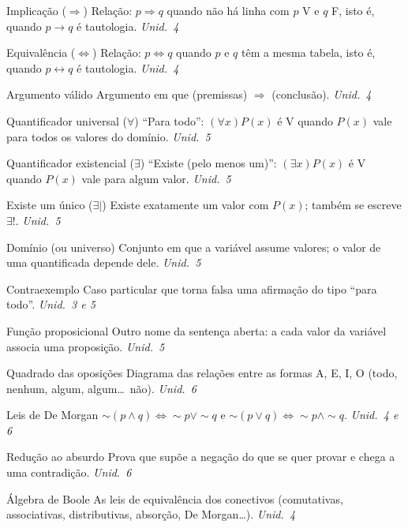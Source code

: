\begin{glossario}
\item[Implicação ($\Rightarrow$)] Relação: $p\Rightarrow q$ quando não há linha com $p$ V e $q$ F, isto é, quando $p\rightarrow q$ é tautologia. \hfill\emph{Unid.~4}
\item[Equivalência ($\Leftrightarrow$)] Relação: $p\Leftrightarrow q$ quando $p$ e $q$ têm a mesma tabela, isto é, quando $p\leftrightarrow q$ é tautologia. \hfill\emph{Unid.~4}
\item[Argumento válido] Argumento em que (premissas) $\Rightarrow$ (conclusão). \hfill\emph{Unid.~4}
\item[Quantificador universal ($\forall$)] \enquote{Para todo}: $(\forall x)P(x)$ é V quando $P(x)$ vale para todos os valores do domínio. \hfill\emph{Unid.~5}
\item[Quantificador existencial ($\exists$)] \enquote{Existe (pelo menos um)}: $(\exists x)P(x)$ é V quando $P(x)$ vale para algum valor. \hfill\emph{Unid.~5}
\item[Existe um único ($\exists|$)] Existe exatamente um valor com $P(x)$; também se escreve $\exists!$. \hfill\emph{Unid.~5}
\item[Domínio (ou universo)] Conjunto em que a variável assume valores; o valor de uma quantificada depende dele. \hfill\emph{Unid.~5}
\item[Contraexemplo] Caso particular que torna falsa uma afirmação do tipo \enquote{para todo}. \hfill\emph{Unid.~3 e 5}
\item[Função proposicional] Outro nome da sentença aberta: a cada valor da variável associa uma proposição. \hfill\emph{Unid.~5}
\item[Quadrado das oposições] Diagrama das relações entre as formas A, E, I, O (todo, nenhum, algum, algum\ldots\ não). \hfill\emph{Unid.~6}
\item[Leis de De Morgan] ${\sim}(p\wedge q)\Leftrightarrow{\sim}p\vee{\sim}q$ e ${\sim}(p\vee q)\Leftrightarrow{\sim}p\wedge{\sim}q$. \hfill\emph{Unid.~4 e 6}
\item[Redução ao absurdo] Prova que supõe a negação do que se quer provar e chega a uma contradição. \hfill\emph{Unid.~6}
\item[Álgebra de Boole] As leis de equivalência dos conectivos (comutativas, associativas, distributivas, absorção, De Morgan\ldots). \hfill\emph{Unid.~4}
\end{glossario}

